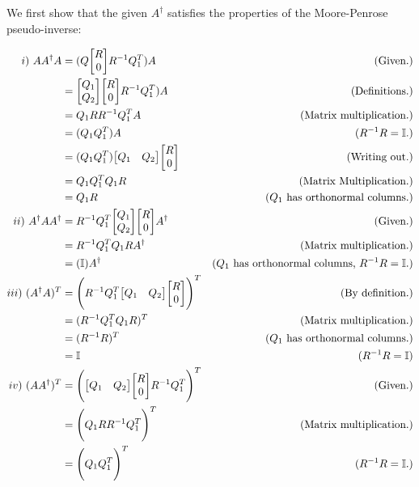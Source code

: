 \partbreak
\begin{solution}

    We first show that the given $A^\dag$ satisfies the properties of the Moore-Penrose pseudo-inverse:

    \alignbreak
    \begin{align*}
        i) \ AA^\dag A &= (Q\mqty[R\\0]R^\inv Q_1^T)A &\text{(Given.)}\\
        &= \mqty[Q_1\\Q_2] \mqty[R\\0]R^\inv Q_1^T)A &\text{(Definitions.)}\\
        &=  Q_1RR^\inv Q_1^T A &\text{(Matrix multiplication.)}\\
        &= (Q_1Q_1^T)A &\text{($R^\inv R = \id$.)}\\
        &= (Q_1Q_1^T)\mqty[Q_1&Q_2]\mqty[R\\0] &\text{(Writing out.)}\\
        &= Q_1Q_1^TQ_1R &\text{(Matrix Multiplication.)}\\
        &= Q_1R &\text{($Q_1$ has orthonormal columns.)}\\
        ii) \ A^\dag A A^\dag &= R^\inv Q_1^T\mqty[Q_1\\Q_2]\mqty[R\\0]A^\dag &\text{(Given.)}\\
        &= R^\inv Q_1^TQ_1R A^\dag &\text{(Matrix multiplication.)}\\
        &= (\id)A^\dag &\text{($Q_1$ has orthonormal columns, $R^\inv R = \id$.)}\\
        iii) \ (A^\dag A)^T &= \Bigg( R^\inv Q_1^T \mqty[Q_1 &Q_2]\mqty[R\\0]\Bigg)^T &\text{(By definition.)}\\
        &= (R^\inv Q_1^TQ_1R)^T &\text{(Matrix multiplication.)}\\
        &= (R^\inv R)^T &\text{($Q_1$ has orthonormal columns.)}\\
        &= \id &\text{($R^\inv R = \id$)}\\
        iv) \ (AA^\dag)^T &=\Bigg(\mqty[Q_1 &Q_2]\mqty[R\\0]R^\inv Q_1^T\Bigg)^T &\text{(Given.)}\\
        &= \Bigg(Q_1RR^\inv Q_1^T\Bigg)^T &\text{(Matrix multiplication.)}\\
        &= \Bigg(Q_1 Q_1^T\Bigg)^T  &(R^\inv R = \id.)\\
    \end{align*}
    \alignbreak


\end{solution}
